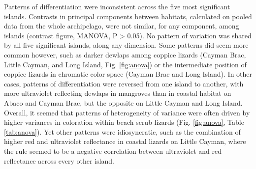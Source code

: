 Patterns of differentiation were inconsistent across the five most significant islands. Contrasts in principal components between habitats, calculated on pooled data from the whole archipelago, were not similar, for any component, among islands (contrast figure, MANOVA, P > 0.05). No pattern of variation was shared by all five significant islands, along any dimension. Some patterns did seem more common however, such as darker dewlaps among coppice lizards (Cayman Brac, Little Cayman, and Long Island, Fig. \ref{fig:anova}) or the intermediate position of coppice lizards in chromatic color space (Cayman Brac and Long Island). In other cases, patterns of differentiation were reversed from one island to another, with more ultraviolet reflecting dewlaps in mangroves than in coastal habitat on Abaco and Cayman Brac, but the opposite on Little Cayman and Long Island. Overall, it seemed that patterns of heterogeneity of variance were often driven by higher variances in coloration within beach scrub lizards (Fig. \ref{fig:anova}, Table \ref{tab:anova}). Yet other patterns were idiosyncratic, such as the combination of higher red and ultraviolet reflectance in coastal lizards on Little Cayman, where the rule seemed to be a negative correlation between ultraviolet and red reflectance across every other island.\\